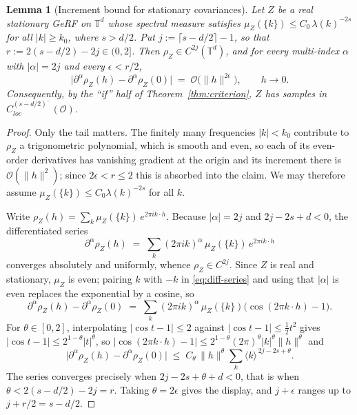 \documentclass[pdflatex,sn-mathphys,Numbered]{sn-jnl}
\theoremstyle{thmstyleone}%
\newtheorem{lemma}[theorem]{Lemma}%
\theoremstyle{thmstyletwo}%
\theoremstyle{thmstylethree}%
\newcommand{\TT}{\mathbb{T}}
\newcommand{\calO}{\mathcal{O}}
\begin{document}
\begin{appendices}
\begin{lemma}[Increment bound for stationary covariances]
\label{lem:increment}
Let $Z$ be a real stationary GeRF on $\TT^d$ whose spectral measure satisfies
$\mu_Z(\{k\}) \leq C_0\,\lambda(k)^{-2s}$ for all $|k| \geq k_0$, where
$s > d/2$. Put $j := \lceil s - d/2\rceil - 1$, so that
$r := 2(s-d/2) - 2j \in (0,2]$. Then $\rho_Z \in C^{2j}(\TT^d)$, and for every
multi-index $\alpha$ with $|\alpha| = 2j$ and every $\epsilon < r/2$,
\[
    \bigl|\partial^\alpha \rho_Z(h) - \partial^\alpha \rho_Z(0)\bigr|
    \;=\; \calO\bigl(\|h\|^{2\epsilon}\bigr), \qquad h\to0 .
\]
Consequently, by the ``if'' half of Theorem~\ref{thm:criterion}, $Z$ has
samples in $C^{(s-d/2)^-}_{loc}(\calO)$.
\end{lemma}

\begin{proof}
Only the tail matters. The finitely many frequencies $|k| < k_0$ contribute to
$\rho_Z$ a trigonometric polynomial, which is smooth and even, so each of its
even-order derivatives has vanishing gradient at the origin and its increment
there is $\calO(\|h\|^2)$; since $2\epsilon < r \leq 2$ this is absorbed into the
claim. We may therefore assume $\mu_Z(\{k\}) \leq C_0\lambda(k)^{-2s}$ for all
$k$.

Write $\rho_Z(h) = \sum_{k} \mu_Z(\{k\})\, e^{2\pi i k\cdot h}$. Because
$|\alpha| = 2j$ and $2j - 2s + d < 0$, the differentiated series
\begin{equation}\label{eq:diff-series}
    \partial^\alpha \rho_Z(h)
    \;=\; \sum_{k} (2\pi i k)^{\alpha}\, \mu_Z(\{k\})\, e^{2\pi i k\cdot h}
\end{equation}
converges absolutely and uniformly, whence $\rho_Z \in C^{2j}$. Since $Z$ is
real and stationary, $\mu_Z$ is even; pairing $k$ with $-k$ in
\eqref{eq:diff-series} and using that $|\alpha|$ is even replaces the
exponential by a cosine, so
\[
    \partial^\alpha \rho_Z(h) - \partial^\alpha \rho_Z(0)
    \;=\; \sum_{k} (2\pi i k)^{\alpha}\, \mu_Z(\{k\})
          \bigl(\cos(2\pi k\cdot h) - 1\bigr) .
\]
For $\theta \in [0,2]$, interpolating $|\cos t - 1| \leq 2$ against
$|\cos t - 1| \leq \tfrac12 t^2$ gives
$|\cos t - 1| \leq 2^{1-\theta}|t|^{\theta}$, so
$|\cos(2\pi k\cdot h) - 1| \leq 2^{1-\theta}(2\pi)^{\theta}|k|^{\theta}\|h\|^{\theta}$
and
\[
    \bigl|\partial^\alpha \rho_Z(h) - \partial^\alpha \rho_Z(0)\bigr|
    \;\leq\; C_\theta\, \|h\|^{\theta} \sum_{k} \langle k\rangle^{\,2j - 2s + \theta} .
\]
The series converges precisely when $2j - 2s + \theta + d < 0$, that is when
$\theta < 2(s - d/2) - 2j = r$. Taking $\theta = 2\epsilon$ gives the display,
and $j + \epsilon$ ranges up to $j + r/2 = s - d/2$.
\end{proof}


\end{appendices}
\end{document}
